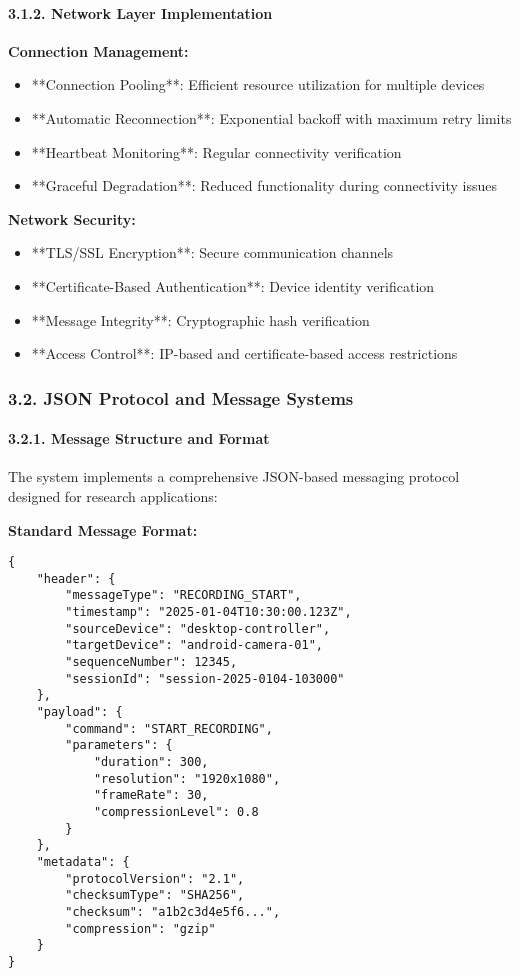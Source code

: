 \documentclass[11pt,a4paper]{article}
\begin{document}
\paragraph{3.1.2. Network Layer Implementation}

\textbf{Connection Management:}

\begin{itemize}
\item **Connection Pooling**: Efficient resource utilization for multiple devices
\item **Automatic Reconnection**: Exponential backoff with maximum retry limits
\item **Heartbeat Monitoring**: Regular connectivity verification
\item **Graceful Degradation**: Reduced functionality during connectivity issues

\end{itemize}
\textbf{Network Security:}

\begin{itemize}
\item **TLS/SSL Encryption**: Secure communication channels
\item **Certificate-Based Authentication**: Device identity verification
\item **Message Integrity**: Cryptographic hash verification
\item **Access Control**: IP-based and certificate-based access restrictions

\end{itemize}
\subsubsection{3.2. JSON Protocol and Message Systems}

\paragraph{3.2.1. Message Structure and Format}

The system implements a comprehensive JSON-based messaging protocol designed for research applications:

\textbf{Standard Message Format:}

\begin{verbatim}
{
    "header": {
        "messageType": "RECORDING_START",
        "timestamp": "2025-01-04T10:30:00.123Z",
        "sourceDevice": "desktop-controller",
        "targetDevice": "android-camera-01",
        "sequenceNumber": 12345,
        "sessionId": "session-2025-0104-103000"
    },
    "payload": {
        "command": "START_RECORDING",
        "parameters": {
            "duration": 300,
            "resolution": "1920x1080",
            "frameRate": 30,
            "compressionLevel": 0.8
        }
    },
    "metadata": {
        "protocolVersion": "2.1",
        "checksumType": "SHA256",
        "checksum": "a1b2c3d4e5f6...",
        "compression": "gzip"
    }
}
\end{verbatim}
\end{document}
